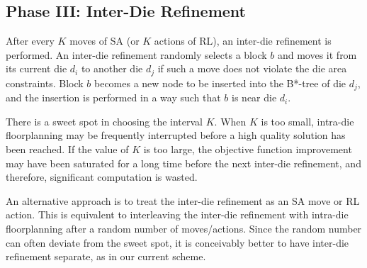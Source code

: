 \subsection{Phase III: Inter-Die Refinement}
\label{sec:refinement}


After every $K$ moves of SA (or $K$ actions of RL), an inter-die refinement is performed. An inter-die refinement randomly selects a block $b$ and moves it from its current
die $d_i$ to another die $d_j$ if such a move does not violate the die area constraints.
Block $b$ becomes a new node to be inserted into the B*-tree of die $d_j$, and the insertion is performed in a way such that $b$ is near die $d_i$. 

There is a sweet spot in choosing the interval $K$. When $K$ is too small, intra-die floorplanning may be frequently interrupted before a high quality solution has been reached. If the value of $K$ is too large, the objective function improvement may have been saturated for a long time before the next inter-die refinement, and therefore, significant computation is wasted. 

An alternative approach is to treat the inter-die refinement as an SA move or RL action. This is equivalent to interleaving the inter-die refinement with intra-die floorplanning after a random number of moves/actions. Since the random number can often deviate from the sweet spot, it is conceivably better to have inter-die refinement separate, as in our current scheme. 


